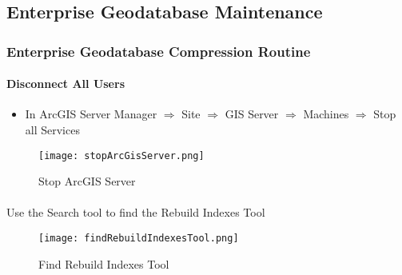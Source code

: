 %
%
%
%
% 
\subsection{Enterprise Geodatabase Maintenance}
\subsubsection{Enterprise Geodatabase Compression Routine}
\paragraph[Disconnect Users]{Disconnect All Users\texorpdfstring{\\}{}}
\begin{itemize}
\item In ArcGIS Server Manager $\Rightarrow$  Site $\Rightarrow$ GIS Server $\Rightarrow$ Machines $\Rightarrow$ Stop all Services
\end{itemize}
\begin{figure}[h!]
\centering
    \texttt{[image: stopArcGisServer.png]}
\vspace*{-10mm}\caption{Stop ArcGIS Server}

\end{figure}
\clearpage
\paragraph*{}Use the Search tool to find the Rebuild Indexes Tool
\begin{figure}[h!]
\centering
    \texttt{[image: findRebuildIndexesTool.png]}
\vspace*{-10mm}\caption{Find Rebuild Indexes Tool}

\end{figure}
\clearpage
